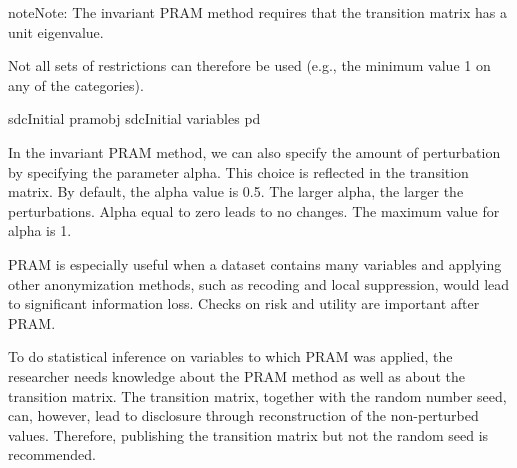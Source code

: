 \documentclass[letterpaper,10pt,english]{sphinxmanual}
\begin{document}
\begin{sphinxadmonition}{note}{Note:}
The invariant PRAM method requires
that the transition matrix has a unit eigenvalue.
\end{sphinxadmonition}

Not all sets of
restrictions can therefore be used (e.g., the minimum value 1 on any of
the categories).

\def\sphinxLiteralBlockLabel{\label{\detokenize{anon_methods:code514}}}
%
\begin{sphinxVerbatim}[commandchars=\\\{\},numbers=left,firstnumber=1,stepnumber=1]
sdcInitial  pramobj  sdcInitial variables  
                   pd     
\end{sphinxVerbatim}

In the invariant PRAM method, we can also specify the amount of
perturbation by specifying the parameter alpha. This choice is reflected
in the transition matrix. By default, the alpha value is 0.5. The larger
alpha, the larger the perturbations. Alpha equal to zero leads to no
changes. The maximum value for alpha is 1.

PRAM is especially useful when a dataset contains many variables and
applying other anonymization methods, such as recoding and local
suppression, would lead to significant information loss. Checks on risk
and utility are important after PRAM.

To do statistical inference on variables to which PRAM was applied, the
researcher needs knowledge about the PRAM method as well as about the
transition matrix. The transition matrix, together with the random
number seed, can, however, lead to disclosure through reconstruction of
the non-perturbed values. Therefore, publishing the transition matrix
but not the random seed is recommended.
\end{document}
